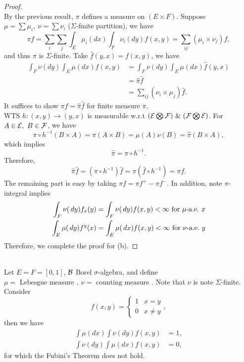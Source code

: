 \begin{proof}\ \\
By the previous result, $\pi$ defines a measure on $(E\times F)$. Suppose $\mu = \sum \mu_i,\ \nu = \sum \nu_i$ ($\Sigma$-finite partition), we have
\begin{equation*}
    \pi f = \sum_{i} \sum_{j} \int_E \mu_i(dx) \int_F \nu_i(dy) f(x,y) = \sum_{ij} (\mu_i \times \nu_j) f,
\end{equation*}
and thus $\pi$ is $\Sigma$-finite. Take $\hat{f}(y,x) = f(x,y)$, we have
\begin{align*}
    \int_F \nu(dy) \int_E \mu(dx) f(x,y) 
    &= \int_F \nu(dy) \int_E \mu(dx) \hat{f}(y,x)\\
    &= \hat{\pi} \hat{f}\\
    &= \sum_{ij} (\nu_i \times \mu_j) \hat{f}.
\end{align*}
It suffices to show $\pi f = \hat{\pi} \hat{f}$ for finite measure $\pi$.\\
WTS $h: (x,y) \to (y,x)$ is measurable w.r.t $(\Es \bigotimes \Fs)\ \&\ (\Fs \bigotimes \Es)$. For $A \in \mathcal{E},\ B \in \mathcal{F}$, we have
\begin{equation*}
    \pi \circ h^{-1} (B \times A) = \pi(A \times B) = \mu(A) \nu(B) = \hat{\pi} (B \times A),
\end{equation*}
which implies
\begin{equation*}
    \hat{\pi} = \pi \circ h^{-1}.
\end{equation*}
Therefore,
\begin{equation*}
    \hat{\pi} \hat{f} = (\pi \circ h^{-1}) \hat{f} = \pi(\hat{f} \circ h^{-1}) = \pi f.
\end{equation*}
The remaining part is easy by taking $\pi f = \pi f^+ - \pi f^-$. In addition, note $\pi$-integral implies
\begin{align*}
    \int_F  \nu(\,dy) f_x(y) &= \int_F \nu(\,dy) f(x,y) < \infty \text{ for } \mu\text{-a.e.}\ x \\
    \int_E  \mu(\,dy) f^y(x) &= \int_E \mu(\,dx) f(x,y) < \infty \text{ for } \nu\text{-a.e.}\ y 
\end{align*}
Therefore, we complete the proof for (b).
\end{proof}


\clearpage
\begin{example}\ \\
Let $E = F = [0,1]$, $\mathcal{B}$ Borel $\sigma$-algebra, and define $\mu = \text{ Lebesgue measure },\ \nu = \text{ counting measure }$. Note that $\nu$ is note $\Sigma$-finite. Consider
\begin{equation*}
    f(x,y) = \left\{\begin{matrix}
1 & x = y\\ 
0 & x \neq y
\end{matrix}\right.,
\end{equation*}
then we have
\begin{align*}
    \int \mu(dx) \int \nu(dy) f(x,y) &= 1,\\
    \int \nu(dy) \int \mu(dx) f(x,y) &= 0,
\end{align*}
for which the Fubini's Theorem does not hold. 
\end{example}

